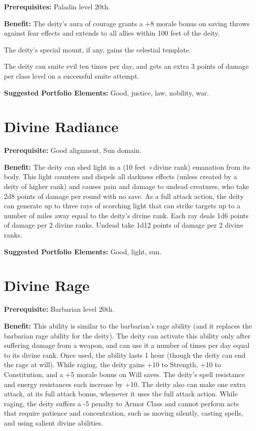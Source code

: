 \documentclass{article}
\begin{document}
\textbf{Prerequisites:} Paladin level 20th.

\textbf{Benefit:} The deity's aura of courage grants a +8 morale bonus on saving 
throws against fear effects and extends to all allies within 100 feet of the deity. 

The deity's special mount, if any, gains the celestial template. 

The deity can smite evil ten times per day, and gets an extra 3 points of damage 
per class level on a successful smite attempt.

\textbf{Suggested Portfolio Elements:} Good, justice, law, nobility, war.

\vspace{12pt}
\section*{Divine Radiance}

\textbf{Prerequisite:} Good alignment, Sun domain.

\textbf{Benefit:} The deity can shed light in a (10 feet \ensuremath{\times}divine 
rank) emanation from its body. This light counters and dispels all darkness effects 
(unless created by a deity of higher rank) and causes pain and damage to undead 
creatures, who take 2d8 points of damage per round with no save. As a full attack 
action, the deity can generate up to three rays of scorching light that can strike 
targets up to a number of miles away equal to the deity's divine rank. Each ray 
deals 1d6 points of damage per 2 divine ranks. Undead take 1d12 points of damage 
per 2 divine ranks.

\textbf{Suggested Portfolio Elements:} Good, light, sun.

\vspace{12pt}
\section*{Divine Rage}

\textbf{Prerequisite:} Barbarian level 20th.

\textbf{Benefit:} This ability is similar to the barbarian's rage ability (and 
it replaces the barbarian rage ability for the deity). The deity can activate this 
ability only after suffering damage from a weapon, and can use it a number of times 
per day equal to its divine rank. Once used, the ability lasts 1 hour (though the 
deity can end the rage at will). While raging, the deity gains +10 to Strength, 
+10 to Constitution, and a +5 morale bonus on Will saves. The deity's spell resistance 
and energy resistances each increase by +10. The deity also can make one extra 
attack, at its full attack bonus, whenever it uses the full attack action. While 
raging, the deity suffers a -5 penalty to Armor Class and cannot perform acts that 
require patience and concentration, such as moving silently, casting spells, and 
using salient divine abilities.
\end{document}
